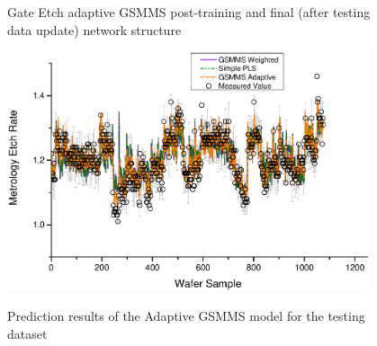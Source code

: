 \begin{figure}[!htpb]
  \centering
  \caption{Gate Etch adaptive GSMMS  post-training and  final (after testing data update) network structure}\label{fig:gate_etch_gsmms}
\end{figure}

\begin{figure}
  \centering
  \includegraphics[width=0.95\textwidth]{figures/application/gate_etch_gsmms_prediction.eps}\\
  \caption{Prediction results of the Adaptive GSMMS model for the testing dataset}\label{fig:gate_etch_gsmms_prediction}
\end{figure}


